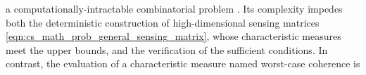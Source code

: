 a computationally-intractable combinatorial problem
\cite{article:TillmannITIT2014}.
Its complexity impedes both
the deterministic construction of
high-dimensional sensing matrices
\eqref{eqn:cs_math_prob_general_sensing_matrix}, whose
characteristic measures meet
the upper bounds, and
the verification of
the sufficient conditions.
In contrast,
the evaluation of
a characteristic measure named
worst-case coherence
\cite[Def. 5.1]{book:Foucart2013} is
